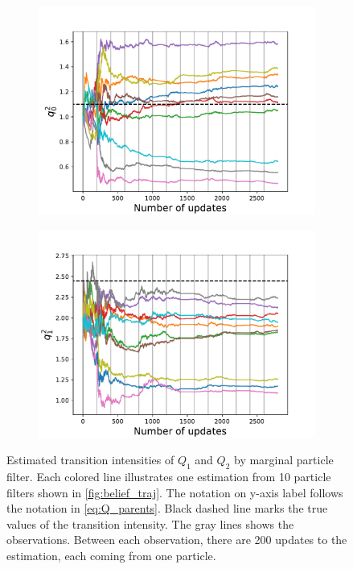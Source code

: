 \begin{figure}[H]
\begin{subfigure}{.5\textwidth}
		\includegraphics[width=1\linewidth]{figures/q_convergence/Q2_01}
		\caption{}
		\label{fig:Q2_01}
	\end{subfigure}
	\begin{subfigure}{.5\textwidth}
		\centering
		\includegraphics[width=1\linewidth]{figures/q_convergence/Q2_10}
		\caption{}
		\label{fig:Q2_10}
	\end{subfigure}
	\caption[Estimation of $ Q_1 $ and $ Q_2 $ by marginal particle filter]{Estimated transition intensities of $ Q_1 $ and $ Q_2 $ by marginal particle filter. Each colored line illustrates one estimation from 10 particle filters shown in \autoref{fig:belief_traj}. The notation on y-axis label follows the notation in \autoref{eq:Q_parents}. Black dashed line marks the true values of the transition intensity. The gray lines shows the observations. Between each observation, there are 200 updates to the estimation, each coming from one particle.}
	\label{fig:q_convergence}
\end{figure}
